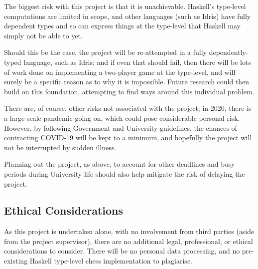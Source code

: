 \documentclass[12pt, a4paper]{scrartcl}
\begin{document}
The biggest risk with this project is that it is unachievable. Haskell's type-level computations are limited in scope, and other languages (such as Idris) have fully dependent types and so can express things at the type-level that Haskell may simply not be able to yet.

Should this be the case, the project will be re-attempted in a fully dependently-typed language, such as Idris; and if even that should fail, then there will be lots of work done on implementing a two-player game at the type-level, and will surely be a specific reason as to why it is impossible. Future research could then build on this foundation, attempting to find ways around this individual problem.

There are, of course, other risks not associated with the project; in 2020, there is a large-scale pandemic going on, which could pose considerable personal risk. However, by following Government and University guidelines, the chances of contracting COVID-19 will be kept to a minimum, and hopefully the project will not be interrupted by sudden illness.

Planning out the project, as above, to account for other deadlines and busy periods during University life should also help mitigate the risk of delaying the project.

\subsection{Ethical Considerations}

As this project is undertaken alone, with no involvement from third parties (aside from the project supervisor), there are no additional legal, professional, or ethical considerations to consider. There will be no personal data processing, and no pre-existing Haskell type-level chess implementation to plagiarise.
\end{document}

